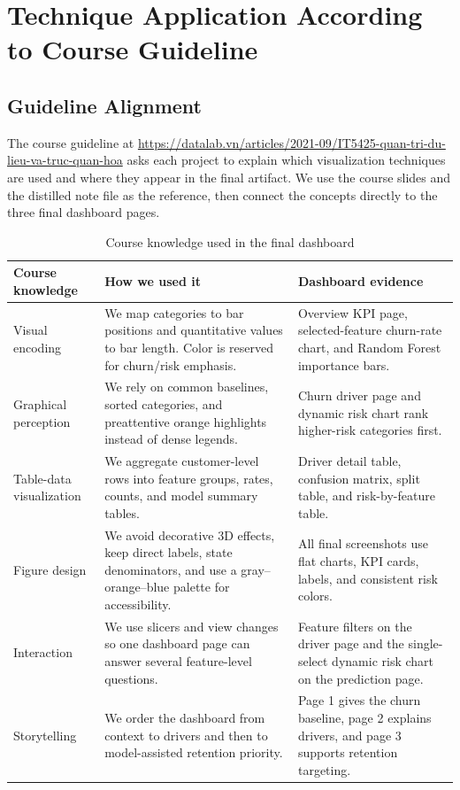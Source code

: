 \section{Technique Application According to Course Guideline}

\subsection{Guideline Alignment}
The course guideline at
\url{https://datalab.vn/articles/2021-09/IT5425-quan-tri-du-lieu-va-truc-quan-hoa}
asks each project to explain which visualization techniques are used and where
they appear in the final artifact. We use the course slides and the distilled
note file  as the
reference, then connect the concepts directly to the three final dashboard
pages.

\begin{table}[h]
\centering
\caption{Course knowledge used in the final dashboard}
\begin{tabularx}{\textwidth}{p{}p{}X}
\toprule
\textbf{Course knowledge} & \textbf{How we used it} & \textbf{Dashboard evidence} \\
\midrule
Visual encoding &
We map categories to bar positions and quantitative values to bar length. Color
is reserved for churn/risk emphasis. &
Overview KPI page, selected-feature churn-rate chart, and Random Forest
importance bars. \\
Graphical perception &
We rely on common baselines, sorted categories, and preattentive orange
highlights instead of dense legends. &
Churn driver page and dynamic risk chart rank higher-risk categories first. \\
Table-data visualization &
We aggregate customer-level rows into feature groups, rates, counts, and model
summary tables. &
Driver detail table, confusion matrix, split table, and risk-by-feature table. \\
Figure design &
We avoid decorative 3D effects, keep direct labels, state denominators, and use
a gray--orange--blue palette for accessibility. &
All final screenshots use flat charts, KPI cards, labels, and consistent risk
colors. \\
Interaction &
We use slicers and view changes so one dashboard page can answer several
feature-level questions. &
Feature filters on the driver page and the single-select dynamic risk chart on
the prediction page. \\
Storytelling &
We order the dashboard from context to drivers and then to model-assisted
retention priority. &
Page 1 gives the churn baseline, page 2 explains drivers, and page 3 supports
retention targeting. \\
\bottomrule
\end{tabularx}
\end{table}

